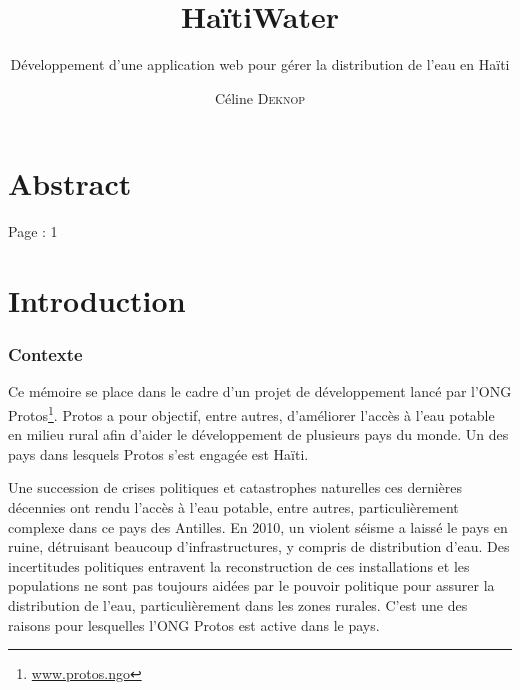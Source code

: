 \documentclass{EPL-master-thesis-covers-FR}
\title{HaïtiWater}
\subtitle{Développement d'une application web pour gérer la distribution de l'eau en Haïti}
\author{Céline \textsc{Deknop}}
\begin{document}
	\maketitle
	\tableofcontents

	\setlength{\parskip}{1.5em plus1em minus1em}


	\chapter*{Abstract}

		Page : 1

	\chapter{Introduction}



		\subsection*{Contexte}

			Ce mémoire se place dans le cadre d'un projet de développement lancé par l'ONG Protos\footnote{\href{https://www.protos.ngo/fr/}{www.protos.ngo}}. Protos a pour objectif, entre autres, d'améliorer l'accès à l'eau potable en milieu rural afin d'aider le développement de plusieurs pays du monde. Un des pays dans lesquels Protos s'est engagée est Haïti.

			Une succession de crises politiques et catastrophes naturelles ces dernières décennies ont rendu l'accès à l'eau potable, entre autres, particulièrement complexe dans ce pays des Antilles. En 2010, un violent séisme a laissé le pays en ruine, détruisant beaucoup d'infrastructures, y compris de distribution d'eau. Des incertitudes politiques entravent la reconstruction de ces installations et les populations ne sont pas toujours aidées par le pouvoir politique pour assurer la distribution de l'eau, particulièrement dans les zones rurales. C'est une des raisons pour lesquelles l'ONG Protos est active dans le pays.
\end{document}
